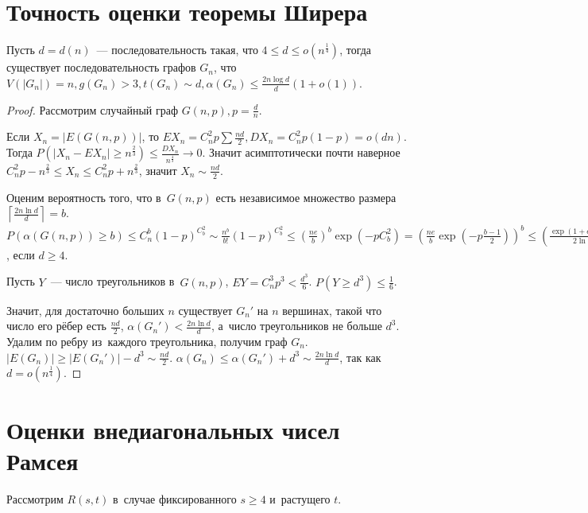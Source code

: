 \documentclass{article}
\begin{document}
\section{Точность оценки теоремы Ширера}

\begin{lemma}
	Пусть $d = d(n)$~--- последовательность такая, что $4 \le d \le
	o(n^\frac{1}{4})$, тогда существует последовательность графов $G_n$, что
	$V(|G_n|) = n, g(G_n) > 3, t(G_n) \sim d, \alpha(G_n) \le \frac{2n \log
	d}{d}(1 + o(1))$.
\end{lemma}
\begin{proof}
	Рассмотрим случайный граф $G(n, p), p = \frac{d}{n}$.

	Если $X_n = |E(G(n,p))|$, то $EX_n = C_n^2 p \sum \frac{nd}{2},
	DX_n = C_n^2 p(1-p) = o(dn)$. Тогда $P(|X_n - EX_n| \ge n^\frac{2}{3}) \le
	\frac{DX_n}{n^\frac{4}{3}} \rightarrow 0$. Значит асимптотически почти
	наверное $C_n^2p - n^\frac{2}{3} \le X_n \le C_n^2p + n^\frac{2}{3}$, значит
	$X_n \sim \frac{nd}{2}$.

	Оценим вероятность того, что в~$G(n, p)$ есть независимое множество размера
	$\left\lceil \frac{2n \ln d}{d} \right\rceil = b$. $P(\alpha(G(n,p)) \ge b)
	\le C_n^b (1-p)^{C_b^2} \sim \frac{n^b}{b!}(1-p)^{C_b^2} \le \left(
	\frac{ne}{b} \right)^b \exp\left(-pC_b^2\right) = \left( \frac{ne}{b}
	\exp\left(-p\frac{b-1}{2}\right) \right)^b \le \left( \frac{\exp(1 + o(1))}{2
	\ln d}\right)^b \rightarrow b$, если $d \ge 4$.

	Пусть $Y$~--- число треугольников в~$G(n,p)$, $EY = C_n^3 p^3 <
	\frac{d^3}{6}$. $P(Y \ge d^3) \le \frac{1}{6}$.

	Значит, для достаточно больших $n$ существует $G_n'$ на $n$ вершинах, такой
	что число его рёбер есть $\frac{nd}{2}$, $\alpha(G_n') < \frac{2n\ln d}{d}$,
	а~число треугольников не больше $d^3$. Удалим по ребру из~каждого
	треугольника, получим граф $G_n$. $|E(G_n)| \ge |E(G_n')| - d^3 \sim
	\frac{nd}{2}$. $\alpha(G_n) \le \alpha(G_n') + d^3 \sim \frac{2n \ln d}{d}$,
	так как $d = o(n^\frac{1}{4})$.
\end{proof}

\section{Оценки внедиагональных чисел Рамсея}

Рассмотрим $R(s, t)$ в~случае фиксированного $s \ge 4$ и~растущего $t$.
\end{document}
